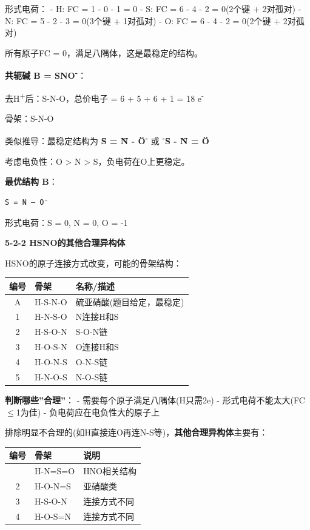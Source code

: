 \documentclass[a4paper,11pt]{ctexart}
\newcounter{none}
\newcommand{\箭}{\ensuremath{\rightarrow}}
\newcommand{\左箭}{\ensuremath{\leftarrow}}
\newcommand{\上箭}{\ensuremath{\uparrow}}
\newcommand{\下箭}{\ensuremath{\downarrow}}
\newcommand{\衡}{\ensuremath{\rightleftharpoons}}
\newcommand{\双箭}{\ensuremath{\leftrightarrow}}
\newcommand{\约等于}{\ensuremath{\approx}}
\newcommand{\小于等于}{\ensuremath{\leq}}
\newcommand{\大于等于}{\ensuremath{\geq}}
\newcommand{\不等于}{\ensuremath{\neq}}
\newcommand{\西格马}{\ensuremath{\sigma}}
\newcommand{\派}{\ensuremath{\pi}}
\begin{document}
形式电荷：
- H: FC = 1 - 0 - 1 = 0
- S: FC = 6 - 4 - 2 = 0(2个键 + 2对孤对)
- N: FC = 5 - 2 - 3 = 0(3个键 + 1对孤对)
- O: FC = 6 - 4 - 2 = 0(2个键 + 2对孤对)

所有原子FC = 0，满足八隅体，这是最稳定的结构。

\textbf{共轭碱 B = SNO\textsuperscript{-}}：

去H\textsuperscript{+}后：S-N-O，总价电子 = 6 + 5 + 6 + 1 = 18 e\textsuperscript{-}

骨架：S-N-O

类似推导：最稳定结构为 \textbf{S̈ = N̈ - Ö\textsuperscript{-}} 或 \textbf{\textsuperscript{-}S̈ - N̈ = Ö}

考虑电负性：O \textgreater{} N \textgreater{} S，负电荷在O上更稳定。

\textbf{最优结构 B}：

\begin{verbatim}
S = N — O⁻
\end{verbatim}

形式电荷：S = 0, N = 0, O = -1

\textbf{5-2-2 HSNO的其他合理异构体}

HSNO的原子连接方式改变，可能的骨架结构：

{\def\LTcaptype{none} %
\begin{longtable}[]{@{}cll@{}}
\toprule\noalign{}
编号 & 骨架 & 名称/描述 \\
\midrule\noalign{}
\endhead
\bottomrule\noalign{}
\endlastfoot
A & H-S-N-O & 硫亚硝酸(题目给定，最稳定) \\
1 & H-N-S-O & N连接H和S \\
2 & H-S-O-N & S-O-N链 \\
3 & H-O-S-N & O连接H和S \\
4 & H-O-N-S & O-N-S链 \\
5 & H-N-O-S & N-O-S链 \\
\end{longtable}
}

\textbf{判断哪些''合理''}：
- 需要每个原子满足八隅体(H只需2e)
- 形式电荷不能太大(\textbar FC\textbar{} \小于等于 1为佳)
- 负电荷应在电负性大的原子上

排除明显不合理的(如H直接连O再连N-S等)，\textbf{其他合理异构体}主要有：

{\def\LTcaptype{none} %
\begin{longtable}[]{@{}cll@{}}
\toprule\noalign{}
编号 & 骨架 & 说明 \\
\midrule\noalign{}
\endhead
\bottomrule\noalign{}
\endlastfoot
1 & H-N=S=O & HNO相关结构 \\
2 & H-O-N=S & 亚硝酸类 \\
3 & H-S-O-N & 连接方式不同 \\
4 & H-O-S=N & 连接方式不同 \\
\end{longtable}
}
\end{document}
